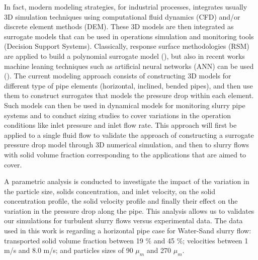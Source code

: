 \documentclass[11pt]{report}
\begin{document}
In fact,  modern modeling strategies, for industrial processes, integrates usually 3D simulation techniques using computational fluid dynamics (CFD) and/or discrete element methods (DEM). 
%
These 3D models are then integrated as surrogate models that can be used in operations simulation and monitoring tools (Decision Support Systems). 
%
Classically, response surface methodologies (RSM) are applied to build a polynomial surrogate model (\citet{Rabhi}), but also in recent works machine leaning techniques such as artificial neural networks (ANN) can be used (\citet{Seong}). 
%
The current modeling approach consists of  constructing 3D models for different type of pipe elements (horizontal, inclined, bended pipes), and then use them to construct surrogates that models the pressure drop within each element. 
%
Such models can then be used in dynamical models for monitoring slurry pipe systems and to conduct sizing studies to cover variations in the operation conditions like inlet pressure and inlet flow rate. 
%
This approach will first be applied to a single fluid flow to validate the approach of constructing a surrogate pressure drop model through 3D numerical simulation, 
%
and then to slurry flows with solid volume fraction corresponding to the applications that are aimed to cover.

A parametric analysis is conducted to investigate the impact of the variation in the particle size, solids concentration, and inlet velocity, 
%
on the solid concentration profile, the solid velocity profile and finally their effect on the variation in the pressure drop along the pipe. 
%
This analysis allows us to validates our simulations for turbulent slurry flows versus experimental data. 
%
The data used in this work is regarding a horizontal pipe case for Water-Sand slurry flow: transported solid volume fraction between 19  $\%$ and 45 $\%$; velocities between 1 m/s and 8.0 m/s; and particles sizes of 90 $\mu_m$ and 270 $\mu_m$. 





\end{document}
